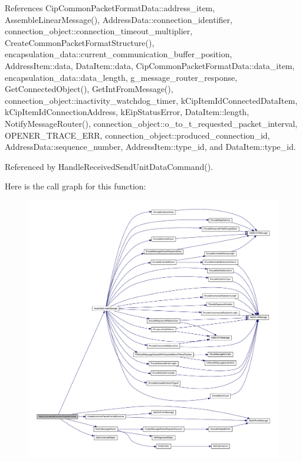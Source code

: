 \-References \-Cip\-Common\-Packet\-Format\-Data\-::address\-\_\-item, \-Assemble\-Linear\-Message(), \-Address\-Data\-::connection\-\_\-identifier, connection\-\_\-object\-::connection\-\_\-timeout\-\_\-multiplier, \-Create\-Common\-Packet\-Format\-Structure(), encapsulation\-\_\-data\-::current\-\_\-communication\-\_\-buffer\-\_\-position, \-Address\-Item\-::data, \-Data\-Item\-::data, \-Cip\-Common\-Packet\-Format\-Data\-::data\-\_\-item, encapsulation\-\_\-data\-::data\-\_\-length, g\-\_\-message\-\_\-router\-\_\-response, \-Get\-Connected\-Object(), \-Get\-Int\-From\-Message(), connection\-\_\-object\-::inactivity\-\_\-watchdog\-\_\-timer, k\-Cip\-Item\-Id\-Connected\-Data\-Item, k\-Cip\-Item\-Id\-Connection\-Address, k\-Eip\-Status\-Error, \-Data\-Item\-::length, \-Notify\-Message\-Router(), connection\-\_\-object\-::o\-\_\-to\-\_\-t\-\_\-requested\-\_\-packet\-\_\-interval, \-O\-P\-E\-N\-E\-R\-\_\-\-T\-R\-A\-C\-E\-\_\-\-E\-R\-R, connection\-\_\-object\-::produced\-\_\-connection\-\_\-id, \-Address\-Data\-::sequence\-\_\-number, \-Address\-Item\-::type\-\_\-id, and \-Data\-Item\-::type\-\_\-id.



\-Referenced by \-Handle\-Received\-Send\-Unit\-Data\-Command().



\-Here is the call graph for this function\-:
\nopagebreak
\begin{figure}[H]
\begin{center}
\leavevmode
\includegraphics[width=350pt]{d4/d91/group__ENCAP_ga045feac9b8747e049e2420df1ec0844b_cgraph}
\end{center}
\end{figure}




